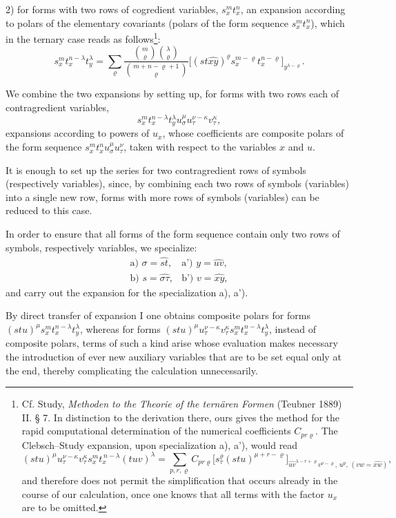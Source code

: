\documentclass[11pt]{article}
\begin{document}
2) for forms with two rows of cogredient variables, $s_x^m t_x^n$, an expansion according to polars of the elementary covariants (polars of the form sequence $s_x^m t_x^n$), which in the ternary case reads as follows\footnote{Cf. Study, \emph{Methoden to the Theorie of the ternären Formen} (Teubner 1889) II. § 7. In distinction to the derivation there, ours gives the method for the rapid computational determination of the numerical coefficients $C_{pr\varrho}$. The Clebsch--Study expansion, upon specialization a), a'), would read
\[
(stu)^\mu u_\tau^{\nu-\kappa}v_\tau^\kappa s_x^m t_x^{\,n-\lambda}(tuv)^\lambda
=\sum_{p,r,\varrho} C_{pr\varrho}
\bigl[s_\tau^\varrho(stu)^{\mu+r-\varrho}\bigr]_{\widehat{uv}^{\lambda-r+\varrho}v^{\nu-\varrho},\,u^p,\,(vw=\widehat{xw})},
\]
and therefore does not permit the simplification that occurs already in the course of our calculation, once one knows that all terms with the factor $u_x$ are to be omitted.}:
\[
\tag{I}
s_x^m t_x^{n-\lambda}t_y^\lambda
=\sum_{\varrho}
\frac{\binom{m}{\varrho}\binom{\lambda}{\varrho}}
{\binom{m+n-\varrho+1}{\varrho}}
\bigl[(st\widehat{xy})^\varrho s_x^{m-\varrho}t_x^{n-\varrho}\bigr]_{y^{\lambda-\varrho}}.
\]

We combine the two expansions by setting up, for forms with two rows each of contragredient variables,
\[
s_x^m t_x^{n-\lambda}t_y^\lambda  u_\sigma^\mu u_\tau^{\nu-\kappa}v_\tau^\kappa,
\]
expansions according to powers of $u_x$, whose coefficients are composite polars of the form sequence $s_x^m t_x^n u_\sigma^\mu u_\tau^\nu$, taken with respect to the variables $x$ and $u$.

It is enough to set up the series for two contragredient rows of symbols (respectively variables), since, by combining each two rows of symbols (variables) into a single new row, forms with more rows of symbols (variables) can be reduced to this case.

In order to ensure that all forms of the form sequence contain only two rows of symbols, respectively variables, we specialize:
\[
\begin{array}{ll}
\text{a) } \sigma=\widehat{st}, & \text{a') } y=\widehat{uv},\\[0.3em]
\text{b) } s=\widehat{\sigma\tau}, & \text{b') } v=\widehat{xy},
\end{array}
\]
and carry out the expansion for the specialization a), a').

By direct transfer of expansion I one obtains composite polars for forms $(stu)^\mu s_x^m t_x^{n-\lambda}t_y^\lambda$, whereas for forms $(stu)^\mu u_\tau^{\nu-\kappa}v_\tau^\kappa s_x^m t_x^{n-\lambda}t_y^\lambda$, instead of composite polars, terms of such a kind arise whose evaluation makes necessary the introduction of ever new auxiliary variables that are to be set equal only at the end, thereby complicating the calculation unnecessarily.
\end{document}
